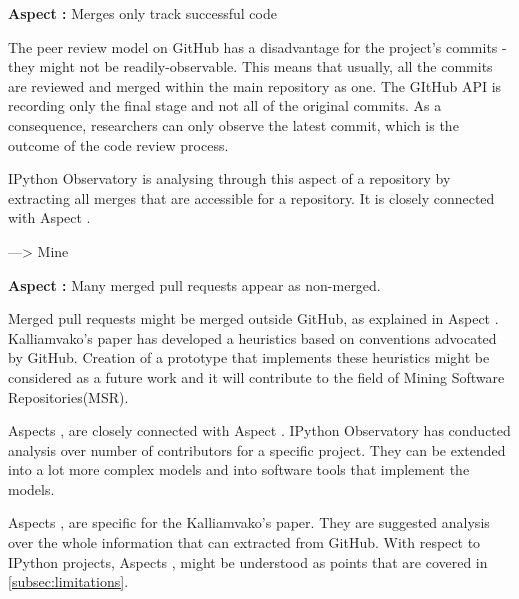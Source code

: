 \vspace{5mm}
\begin{mdframed}
\vspace{1px}
\textbf{Aspect :}  Merges only track successful code
\vspace{1px}
\end{mdframed}
\vspace{2mm}

The peer review model on GitHub has a disadvantage for the project's commits - they might not be readily-observable. This means that usually, all the commits are reviewed and merged within the main repository as one. The GItHub API\cite{gitHubAPI} is recording only the final stage and not all of the original commits. As a consequence, researchers can only observe the latest commit, which is the outcome of the code review process\cite{kalliamvakoupromises}.

IPython Observatory is analysing through this aspect of a repository by extracting all merges that are accessible for a repository. It is closely connected with Aspect .

---> Mine

\vspace{5mm}
\begin{mdframed}
\vspace{1px}
\textbf{Aspect :}  Many merged pull requests appear as non-merged.
\vspace{1px}
\end{mdframed}
\vspace{2mm}

Merged pull requests might be merged outside GitHub, as explained in Aspect . Kalliamvako's paper\cite{kalliamvakoupromises} has developed a heuristics based on conventions advocated by GitHub. Creation of a prototype that implements these heuristics might be considered as a future work and it will contribute to the field of Mining Software Repositories(MSR)\cite{MSR2016}.

\vspace{8mm}

Aspects ,  are closely connected with Aspect . IPython Observatory has conducted analysis over number of contributors for a specific project. They can be extended into a lot more complex models and into software tools that implement the models. 

Aspects ,  are specific for the Kalliamvako's paper\cite{kalliamvakoupromises}. They are suggested analysis over the whole information that can extracted from GitHub. With respect to IPython projects, Aspects ,  might be understood as points that are covered in \ref{subsec:limitations}.




